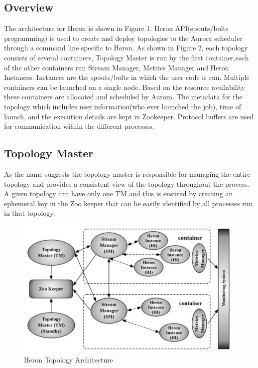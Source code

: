 \documentclass[9pt,twocolumn,twoside]{styles/osajnl}
\begin{document}
\subsection{Overview}
The architecture for Heron is shown in Figure 1. Heron API(spouts/bolts programming) is used to create and
deploy topologies to the Aurora scheduler through a command line specific to Heron. As shown in Figure 2, each topology consists of several containers, Topology Master is run by the first container,each of the other containers run Stream Manager, Metrics Manager and Heron Instances. Instances are the spouts/bolts in which the user code is run. Multiple containers can be launched on a single node. Based on the resource availability these containers are allocated and scheduled by Aurora. The metadata for the topology which includes user information(who ever launched the job), time of launch, and the execution details are kept in Zookeeper. Protocol buffers  are used for communication within the different processes.
\subsection{Topology Master}
As the name suggests the topology master is responsible for managing the entire topology and provides a consistent view of the topology throughout the process. A given topology can have only one TM and this is ensured by creating an ephemeral key in the Zoo keeper that can be easily identified by all processes run in that topology. 
\begin{figure}[htbp]
\begin{center}
\centering
\includegraphics[width=\linewidth]{images/img2}
\caption{Heron Topology Architecture \cite{TwitterHeron2}}
\label{fig:false-color}
\end{center}
\end{figure}
\end{document}
